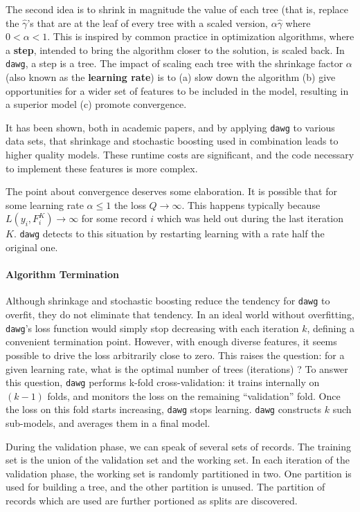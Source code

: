 \documentclass{article}
\begin{document}
The second idea is to shrink in magnitude the value of each tree (that
is, replace the $\hat \gamma$'s that are at the leaf of every tree
with a scaled version, $\alpha \hat \gamma$ where $0 < \alpha < 1$.
This is inspired by common practice in optimization algorithms, where
a {\bf step}, intended to bring the algorithm closer to the solution,
is scaled back.  In \texttt{dawg}, a step is a tree.  The impact of
scaling each tree with the shrinkage factor $\alpha$ (also known as
the {\bf learning rate}) is to (a) slow down the algorithm (b) give
opportunities for a wider set of features to be included in the model,
resulting in a superior model (c) promote convergence.

It has been shown, both in academic papers, and by applying
\texttt{dawg} to various data sets, that shrinkage and stochastic
boosting used in combination leads to higher quality models.  These
runtime costs are significant, and the code necessary to implement
these features is more complex.

The point about convergence deserves some elaboration.  It is possible
that for some learning rate $\alpha \le 1$ the loss $Q \rightarrow
\infty$.  This happens typically because $L(y_i, F_i^K) \rightarrow
\infty$ for some record $i$ which was held out during the last
iteration $K$.  \texttt{dawg} detects to this situation by restarting
learning with a rate half the original one.

\paragraph{Algorithm Termination}

Although shrinkage and stochastic boosting reduce the tendency for
\texttt{dawg} to overfit, they do not eliminate that tendency.  In an
ideal world without overfitting, \texttt{dawg}'s loss function would
simply stop decreasing with each iteration $k$, defining a convenient
termination point.  However, with enough diverse features, it seems
possible to drive the loss arbitrarily close to zero.  This raises the
question: for a given learning rate, what is the optimal number of
trees (iterations) ?  To answer this question, \texttt{dawg} performs
k-fold cross-validation: it trains internally on $(k-1)$ folds, and
monitors the loss on the remaining ``validation'' fold.  Once the loss
on this fold starts increasing, \texttt{dawg} stops learning.
\texttt{dawg} constructs $k$ such sub-models, and averages them in a
final model.

During the validation phase, we can speak of several sets of records.
The training set is the union of the validation set and the working
set.  In each iteration of the validation phase, the working set is
randomly partitioned in two.  One partition is used for building a
tree, and the other partition is unused.  The partition of records
which are used are further portioned as splits are discovered.
\end{document}
